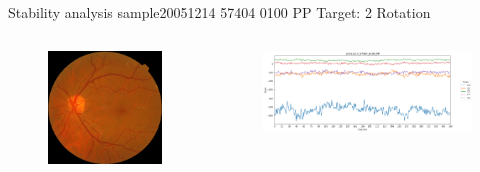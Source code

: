 \documentclass{beamer}
\begin{document}
\begin{frame}{Stability analysis sample}{20051214 57404 0100 PP Target: 2 Rotation}
\begin{columns}
\begin{column}{0.3\textwidth}
\begin{figure}[p]
\centering
\includegraphics[width=\textwidth]{chapter_stability/20051214_57404_0100_PP/20051214_57404_0100_PP.jpeg}
\end{figure}	
\end{column}
\begin{column}{0.45\textwidth}  %
\begin{figure}[p]
\centering
\includegraphics[width=\textwidth]{chapter_stability/20051214_57404_0100_PP/r/scores.png}
\end{figure}
\centering
\href{run:videos_stability/Messidor_20051214_57404_0100_PP_Target_2_Checking_Rotation_Sensitivity.mp4}{\color{blue}{Rotation Visualization}} 
\end{column}
\end{columns}
\end{frame}
\end{document}
